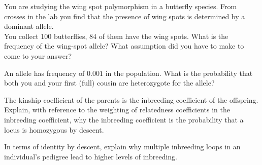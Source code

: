 \begin{question}{}
You are studying the wing spot polymorphism in a butterfly
species. From crosses in the lab you find that the presence of
wing spots is determined by a dominant allele.\\
You collect 100 butterflies, 84 of them have the wing spots. What is
the frequency of the wing-spot allele? What assumption did you have to make to come to your answer?
\end{question}

\begin{question}{}
An allele has frequency of $0.001$ in the population. What is the
probability that both you and your first (full) cousin are heterozygote for
the allele?
\end{question}

\begin{question}{}
The kinship coefficient of the parents is the inbreeding coefficient
of the offspring. Explain, with reference to the weighting of
relatedness coefficients in the inbreeding coefficient, why the
inbreeding coefficient is the probability that a locus is homozygous
by descent.
\end{question}

\begin{question}{}
  In terms of identity by descent, explain why multiple
inbreeding loops in an individual's pedigree lead to higher levels of
inbreeding.  \end{question}


